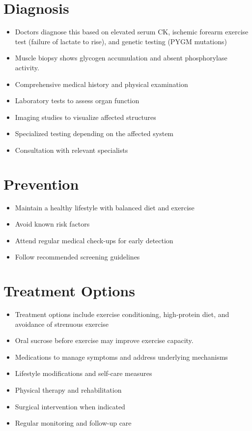 \section{Diagnosis}
\begin{itemize}[noitemsep]
  \item Doctors diagnose this based on elevated serum CK, ischemic forearm exercise test (failure of lactate to rise), and genetic testing (PYGM mutations)
  \item Muscle biopsy shows glycogen accumulation and absent phosphorylase activity.
  \item Comprehensive medical history and physical examination
  \item Laboratory tests to assess organ function
  \item Imaging studies to visualize affected structures
  \item Specialized testing depending on the affected system
  \item Consultation with relevant specialists
\end{itemize}
\section{Prevention}
\begin{itemize}[noitemsep]
  \item Maintain a healthy lifestyle with balanced diet and exercise
  \item Avoid known risk factors
  \item Attend regular medical check-ups for early detection
  \item Follow recommended screening guidelines
\end{itemize}
\section{Treatment Options}
\begin{itemize}[noitemsep]
  \item Treatment options include exercise conditioning, high-protein diet, and avoidance of strenuous exercise
  \item Oral sucrose before exercise may improve exercise capacity.
  \item Medications to manage symptoms and address underlying mechanisms
  \item Lifestyle modifications and self-care measures
  \item Physical therapy and rehabilitation
  \item Surgical intervention when indicated
  \item Regular monitoring and follow-up care
\end{itemize}
